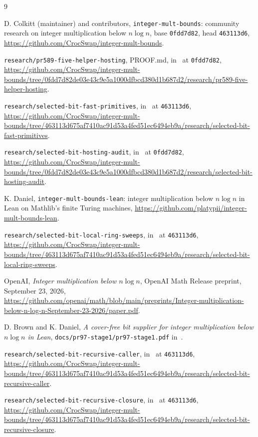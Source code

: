 \documentclass[11pt]{amsart}
\begin{document}
\begin{thebibliography}{9}\raggedright

 D. Colkitt (maintainer) and contributors, \texttt{integer-mult-bounds}: community
research on integer multiplication below $n \log n$, base \texttt{0fdd7d82}, head
\texttt{463113d6}, \url{https://github.com/CrocSwap/integer-mult-bounds}.

 \texttt{research/pr589-five-helper-hosting}, PROOF.md, in~\cite{CS} at
\texttt{0fdd7d82},
\url{https://github.com/CrocSwap/integer-mult-bounds/tree/0fdd7d82de03e43c9e5a1000dfbcd380d1b687d2/research/pr589-five-helper-hosting}.

 \texttt{research/selected-bit-fast-primitives}, in~\cite{CS} at \texttt{463113d6},
\url{https://github.com/CrocSwap/integer-mult-bounds/tree/463113d675af7410ac91d53a4fed51ec6494eb9a/research/selected-bit-fast-primitives}.

 \texttt{research/selected-bit-hosting-audit}, in~\cite{CS} at \texttt{0fdd7d82},
\url{https://github.com/CrocSwap/integer-mult-bounds/tree/0fdd7d82de03e43c9e5a1000dfbcd380d1b687d2/research/selected-bit-hosting-audit}.

 K. Daniel, \texttt{integer-mult-bounds-lean}: integer multiplication
below $n \log n$ in Lean on Mathlib's finite Turing machines,
\url{https://github.com/platypii/integer-mult-bounds-lean}.

 \texttt{research/selected-bit-local-ring-sweeps}, in~\cite{CS} at
\texttt{463113d6},
\url{https://github.com/CrocSwap/integer-mult-bounds/tree/463113d675af7410ac91d53a4fed51ec6494eb9a/research/selected-bit-local-ring-sweeps}.

 OpenAI,
\emph{Integer multiplication below $n \log n$}, OpenAI Math Release preprint, September 23, 2026,
\url{https://github.com/openai/math/blob/main/preprints/Integer-multiplication-below-n-log-n-September-23-2026/paper.pdf}.

 D. Brown and K. Daniel, \emph{A cover-free bit supplier for integer multiplication
below $n \log n$ in Lean}, \texttt{docs/pr97-stage1/pr97-stage1.pdf} in~\cite{IMB}.

 \texttt{research/selected-bit-recursive-caller}, in~\cite{CS} at
\texttt{463113d6},
\url{https://github.com/CrocSwap/integer-mult-bounds/tree/463113d675af7410ac91d53a4fed51ec6494eb9a/research/selected-bit-recursive-caller}.

 \texttt{research/selected-bit-recursive-closure}, in~\cite{CS} at
\texttt{463113d6},
\url{https://github.com/CrocSwap/integer-mult-bounds/tree/463113d675af7410ac91d53a4fed51ec6494eb9a/research/selected-bit-recursive-closure}.


\end{thebibliography}
\end{document}
